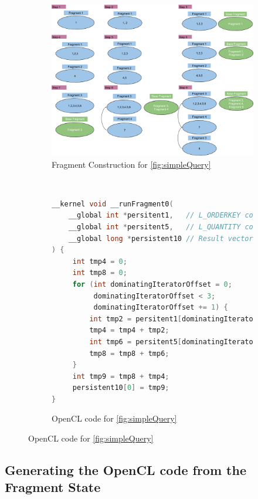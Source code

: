 \begin{figure}[h]
\centering

\begin{subfigure}{0.99\linewidth}
\includegraphics[width=\textwidth]{design-and-implementation/FragmentConstruction.png}
\centering
\caption{Fragment Construction for \ref{fig:simpleQuery}}
\label{fig:fragConstruction}
\end{subfigure}
\\[5ex]
\begin{subfigure}{0.7\linewidth}
\begin{lstlisting}[frame=single, language=C]
__kernel void __runFragment0(
    __global int *persitent1,   // L_ORDERKEY column vector
    __global int *persitent5,   // L_QUANTITY column vector
    __global long *persistent10 // Result vector
) {
     int tmp4 = 0;
     int tmp8 = 0;
     for (int dominatingIteratorOffset = 0; 
          dominatingIteratorOffset < 3; 
          dominatingIteratorOffset += 1) {
         int tmp2 = persitent1[dominatingIteratorOffset];
         tmp4 = tmp4 + tmp2;
         int tmp6 = persitent5[dominatingIteratorOffset];
         tmp8 = tmp8 + tmp6;
     }
     int tmp9 = tmp8 + tmp4;
     persistent10[0] = tmp9;
}
\end{lstlisting}
    \caption{OpenCL code for \ref{fig:simpleQuery}}
    \label{fig:opencl-code}
\end{subfigure}

\end{figure}


\subsection{Generating the OpenCL code from the Fragment State}

